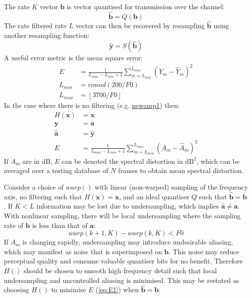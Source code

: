 \documentclass{article}
\begin{document}
The rate $K$ vector $\mathbf{b}$ is vector quantised for transmission over the channel:
\begin{equation}
\hat{\mathbf{b}} = Q(\mathbf{b})
\end{equation}
The rate filtered rate $L$ vector can then be recovered by resampling $\mathbf{\hat{b}}$ using another resampling function:
\begin{equation}
\hat{\mathbf{y}} = S(\hat{\mathbf{b}})
\end{equation}
A useful error metric is the mean square error:
\begin{equation} \label{eq:E1}
\begin{split}
E & =\frac{1}{L_{max}-L_{min}+1}\sum_{m=L_{min}}^{L_{max}}(Y_m-\hat{Y}_m)^2 \\
L_{min} & = round(200/F0) \\
L_{max} & =\left \lfloor 3700/F0  \right \rfloor
\end{split}
\end{equation}
In the case where there is no filtering (e.g. \url{newamp1}) then:
\begin{equation}
\begin{split}
H(\mathbf{x}) &= \mathbf{x} \\
\mathbf{y} &= \mathbf{a} \\
\hat{\mathbf{a}} &= \hat{\mathbf{y}} \\
E &=\frac{1}{L_{max}-L_{min}+1}\sum_{m=L_{min}}^{L_{max}}(A_m-\hat{A}_m)^2 
\end{split}
\end{equation}
If $A_m$ are in dB, $E$ can be denoted the spectral distortion in $\textrm{dB}^2$, which can be averaged over a testing database of $N$ frames to obtain mean spectral distortion.

Consider a choice of $warp()$ with linear (non-warped) sampling of the frequency axis, no filtering such that $H(\mathbf{x})=\mathbf{x}$, and an ideal quantiser $Q$ such that $\hat{\mathbf{b}} = \mathbf{b}$. If $K<L$ information may be lost due to undersampling, which implies $\hat{\mathbf{a}} \neq \mathbf{a}$.  
With nonlinear sampling, there will be local undersampling where the sampling rate of $\mathbf{b}$ is less than that of $\mathbf{a}$:
\begin{equation} \label{eq:local_undersampling}
warp(k+1,K)-warp(k,K) < F0
\end{equation}
If $A_m$ is changing rapidly, undersampling may introduce undesirable aliasing, which may manifest as noise that is superimposed on $\mathbf{b}$. This noise may reduce perceptual quality and consume valuable quantiser bits for no benefit. Therefore $H()$ should be chosen to smooth high frequency detail such that local undersampling and uncontrolled aliasing is minimised. This may be restated as choosing $H()$ to minimise $E$ (\ref{eq:E1}) when $\hat{\mathbf{b}} = \mathbf{b}$.
\end{document}
